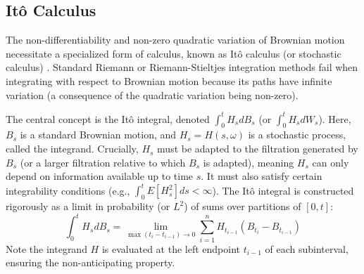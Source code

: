 \documentclass[11pt,twoside,openright]{report}
\begin{document}
\subsection{Itô Calculus}
\label{subsec:ito_calculus}

The non-differentiability and non-zero quadratic variation of Brownian motion necessitate a specialized form of calculus, known as Itô calculus (or stochastic calculus) \cite{protter2004stochastic}. Standard Riemann or Riemann-Stieltjes integration methods fail when integrating with respect to Brownian motion because its paths have infinite variation (a consequence of the quadratic variation being non-zero).

The central concept is the Itô integral, denoted $\int_0^t H_s dB_s$ (or $\int_0^t H_s dW_s$). Here, $B_s$ is a standard Brownian motion, and $H_s = H(s, \omega)$ is a stochastic process, called the integrand. Crucially, $H_s$ must be adapted to the filtration generated by $B_s$ (or a larger filtration relative to which $B_s$ is adapted), meaning $H_s$ can only depend on information available up to time $s$. It must also satisfy certain integrability conditions (e.g., $\int_0^t E[H_s^2] ds < \infty$). The Itô integral is constructed rigorously as a limit in probability (or $L^2$) of sums over partitions of $[0, t]$:
\begin{equation}
\int_0^t H_s dB_s = \lim_{\max(t_i - t_{i-1}) \to 0} \sum_{i=1}^n H_{t_{i-1}} (B_{t_i} - B_{t_{i-1}})
\label{eq:ito_integral}
\end{equation}
Note the integrand $H$ is evaluated at the left endpoint $t_{i-1}$ of each subinterval, ensuring the non-anticipating property.
\end{document}
